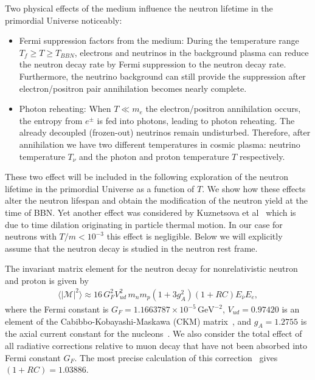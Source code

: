 Two physical effects of the medium influence the neutron lifetime in the primordial Universe noticeably:
\begin{itemize}
\item Fermi suppression factors from the medium: 
During the temperature range $T_f\geqslant T\geqslant T_{BBN}$, electrons and neutrinos in the background plasma can reduce the neutron decay rate by Fermi suppression to the neutron decay rate. Furthermore, the neutrino background can still provide the suppression after electron/positron pair annihilation becomes nearly complete.
\item Photon reheating:
When $T\ll m_e$ the electron/positron annihilation occurs, the entropy from $e^\pm$ is fed into photons, leading to photon reheating. The already decoupled (frozen-out) neutrinos remain undisturbed. Therefore, after annihilation we have two different temperatures in cosmic plasma: neutrino temperature $T_\nu$ and the photon and proton temperature $T$ respectively.
\end{itemize}
These two effect will be included in the following exploration of the neutron lifetime in the primordial Universe as a function of $T$. We show how these effects alter the neutron lifespan and obtain the modification of the neutron yield at the time of BBN. Yet another effect was considered by Kuznetsova et al~\cite{Kuznetsova:2010pi} which is due to time dilation originating in particle thermal motion. In our case for neutrons with $T/m<10^{-3}$ this effect is negligible. Below we will explicitly assume that the neutron decay is studied in the neutron rest frame.

The invariant matrix element for the neutron decay  for nonrelativistic neutron and proton is given by
\begin{align}
\langle|\mathcal{M}|^2\rangle\approx16\,G^2_FV^2_{ud}\,m_nm_p(1+3g^2_A)(1+RC)E_{\bar{\nu}}E_e,
\end{align}
where the Fermi constant is $G_F=1.1663787\times10^{-5}\,\mathrm{GeV}^{-2}$, $V_{ud}=0.97420$ is an element of the Cabibbo-Kobayashi-Maskawa (CKM) matrix~\cite{Czarnecki:2018okw,Marciano:2005ec,Czarnecki:2004cw}, and $g_A=1.2755$ is the axial current constant for the nucleons~\cite{Czarnecki:2018okw,Marciano:2014ria}. We also consider the total effect of all radiative corrections relative to muon decay that have not been absorbed into Fermi constant $G_F$. The most precise calculation of this correction~\cite{Marciano:2014ria,Marciano:2005ec} gives $(1+RC)=1.03886$. 

